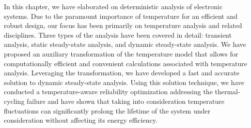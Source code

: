 In this chapter, we have elaborated on deterministic analysis of electronic
systems. Due to the paramount importance of temperature for an efficient and
robust design, our focus has been primarily on temperature analysis and related
disciplines. Three types of the analysis have been covered in detail: transient
analysis, static steady-state analysis, and dynamic steady-state analysis. We
have proposed an auxiliary transformation of the temperature model that allows
for computationally efficient and convenient calculations associated with
temperature analysis. Leveraging the transformation, we have developed a fast
and accurate solution to dynamic steady-state analysis. Using this solution
technique, we have conducted a temperature-aware reliability optimization
addressing the thermal-cycling failure and have shown that taking into
consideration temperature fluctuations can significantly prolong the lifetime of
the system under consideration without affecting its energy efficiency.
